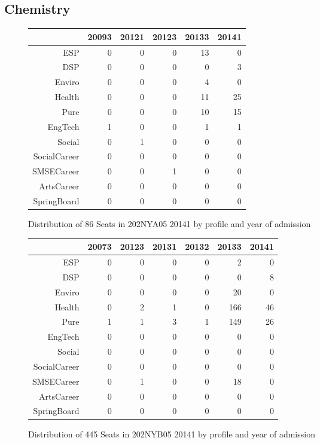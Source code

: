 \documentclass{article}\usepackage[]{graphicx}\usepackage[]{color}
\begin{document}
\subsection{Chemistry}
\begin{figure}[H]
\centering
\begin{tabular}{rrrrrr}
  \hline
 & 20093 & 20121 & 20123 & 20133 & 20141 \\ 
  \hline
ESP &   0 &   0 &   0 &  13 &   0 \\ 
  DSP &   0 &   0 &   0 &   0 &   3 \\ 
  Enviro &   0 &   0 &   0 &   4 &   0 \\ 
  Health &   0 &   0 &   0 &  11 &  25 \\ 
  Pure &   0 &   0 &   0 &  10 &  15 \\ 
  EngTech &   1 &   0 &   0 &   1 &   1 \\ 
  Social &   0 &   1 &   0 &   0 &   0 \\ 
  SocialCareer &   0 &   0 &   0 &   0 &   0 \\ 
  SMSECareer &   0 &   0 &   1 &   0 &   0 \\ 
  ArtsCareer &   0 &   0 &   0 &   0 &   0 \\ 
  SpringBoard &   0 &   0 &   0 &   0 &   0 \\ 
   \hline
\end{tabular}
\caption{Distribution of 86 Seats in 202NYA05 20141 by profile and year of admission} 
\end{figure}
\begin{figure}[H]
\centering
\begin{tabular}{rrrrrrr}
  \hline
 & 20073 & 20123 & 20131 & 20132 & 20133 & 20141 \\ 
  \hline
ESP &   0 &   0 &   0 &   0 &   2 &   0 \\ 
  DSP &   0 &   0 &   0 &   0 &   0 &   8 \\ 
  Enviro &   0 &   0 &   0 &   0 &  20 &   0 \\ 
  Health &   0 &   2 &   1 &   0 & 166 &  46 \\ 
  Pure &   1 &   1 &   3 &   1 & 149 &  26 \\ 
  EngTech &   0 &   0 &   0 &   0 &   0 &   0 \\ 
  Social &   0 &   0 &   0 &   0 &   0 &   0 \\ 
  SocialCareer &   0 &   0 &   0 &   0 &   0 &   0 \\ 
  SMSECareer &   0 &   1 &   0 &   0 &  18 &   0 \\ 
  ArtsCareer &   0 &   0 &   0 &   0 &   0 &   0 \\ 
  SpringBoard &   0 &   0 &   0 &   0 &   0 &   0 \\ 
   \hline
\end{tabular}
\caption{Distribution of 445 Seats in 202NYB05 20141 by profile and year of admission} 
\end{figure}
\end{document}
